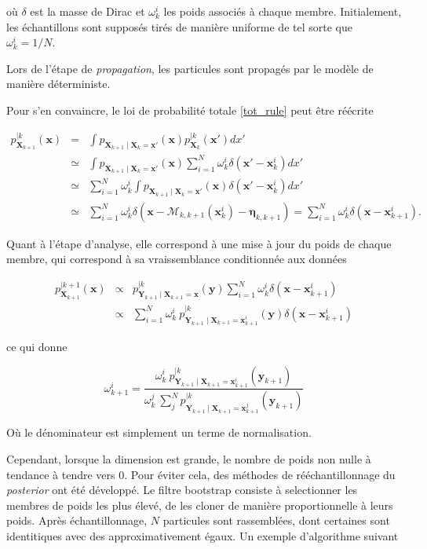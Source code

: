 où $\delta$ est la masse de Dirac et $\omega^i_k$ les poids associés à chaque membre. Initialement, les échantillons sont supposés tirés de manière uniforme de tel sorte que $\omega^i_k = 1/N$.

Lors de l'étape de \textit{propagation}, les particules sont propagés par le modèle de manière déterministe.

Pour s'en convaincre, le loi de probabilité totale \ref{tot_rule} peut être réécrite

\begin{eqnarray*}
    p_{\bm X_{k+1}}^{\mid k}(\bm x) &=& \int p_{\bm X_{k+1}\mid \bm X_{k} = \bm x'}(\bm x) p_{\bm X_{k}}^{\mid k}(\bm x')dx' \\
    &\simeq& \int p_{\bm X_{k+1}\mid \bm X_{k} = \bm x'}(\bm x) \sum_{i=1}^N \omega^i_k \delta(\bm x' - \bm x_k^i) dx' \\
    &\simeq& \sum_{i=1}^N \omega^i_k  \int p_{\bm X_{k+1}\mid \bm X_{k} = \bm x'}(\bm x) \delta(\bm x' - \bm x_k^i) dx' \\
    &\simeq& \sum_{i=1}^N \omega^i_k \delta(\bm x - \mathcal M_{k,k+1}(\bm x_k^i) - \bm \eta_{k,k+1}) = \sum_{i=1}^N \omega^i_k \delta(\bm x - \bm x_{k+1}^i).
\end{eqnarray*}

Quant à l'étape d'analyse, elle correspond à une mise à jour du poids de chaque membre, qui correspond à sa vraissemblance conditionnée aux données

\begin{eqnarray*}
    p_{\bm X_{k+1}}^{\mid k+1}(\bm x) &\propto& p_{\bm Y_{k+1} \mid \bm X_{k+1} = \bm x}^{\mid k}(\bm y)  \sum_{i=1}^N \omega^i_k \delta(\bm x - \bm x_{k+1}^i) \\
    &\propto& \sum_{i=1}^N  \omega^i_k~p_{\bm Y_{k+1} \mid \bm X_{k+1} = \bm x_{k+1}^i}^{\mid k}(\bm y)\delta(\bm x - \bm x_{k+1}^i)
\end{eqnarray*}

ce qui donne

\begin{equation*}
    \omega^i_{k+1}  = \frac{\omega^i_k~p_{\bm Y_{k+1} \mid \bm X_{k+1} = \bm x_{k+1}^i}^{\mid k}(\bm y_{k+1}) }{\omega^j_k~\sum_j^N p_{\bm Y_{k+1} \mid \bm X_{k+1} = \bm x_{k+1}^j}^{\mid k}(\bm y_{k+1}) }
\end{equation*}

Où le dénominateur est simplement un terme de normalisation.

Cependant, lorsque la dimension est grande, le nombre de poids non nulle à tendance à tendre vers 0. Pour éviter cela, des méthodes de rééchantillonnage du \textit{posterior} ont été développé. Le filtre bootstrap \cite{gordon_1993} consiste à selectionner les membres de poids les plus élevé, de les cloner de manière proportionnelle à leurs poids. Après échantillonnage, $N$ particules sont rassemblées, dont certaines sont identitiques avec des approximativement égaux.
Un exemple d'algorithme suivant

